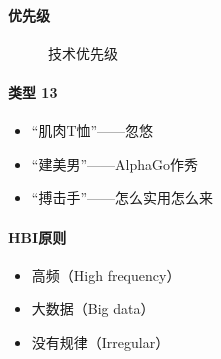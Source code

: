 \documentclass[letterpaper,11pt,english]{sphinxmanual}
\begin{document}
\paragraph{优先级}
\label{\detokenize{chapter_introduction/AI:id12}}
\begin{figure}[H]
\centering
\capstart

\noindent{}
\caption{技术优先级\sphinxfootnotemark[184]}\label{\detokenize{chapter_introduction/AI:id37}}\end{figure}
%
\begin{footnotetext}[184]\sphinxAtStartFootnote
{}
%
\end{footnotetext}\ignorespaces 

\paragraph{类型 13\sphinxfootnotemark[185]}
\label{\detokenize{chapter_introduction/AI:id13}}%
\begin{footnotetext}[185]\sphinxAtStartFootnote
{}
%
\end{footnotetext}\ignorespaces \begin{itemize}
\item {} 
“肌肉T恤”——忽悠

\item {} 
“建美男”——AlphaGo作秀

\item {} 
“搏击手”——怎么实用怎么来

\end{itemize}


\paragraph{HBI原则}
\label{\detokenize{chapter_introduction/AI:hbi}}\begin{itemize}
\item {} 
高频（High frequency）

\item {} 
大数据（Big data）

\item {} 
没有规律（Irregular）

\end{itemize}
\end{document}
